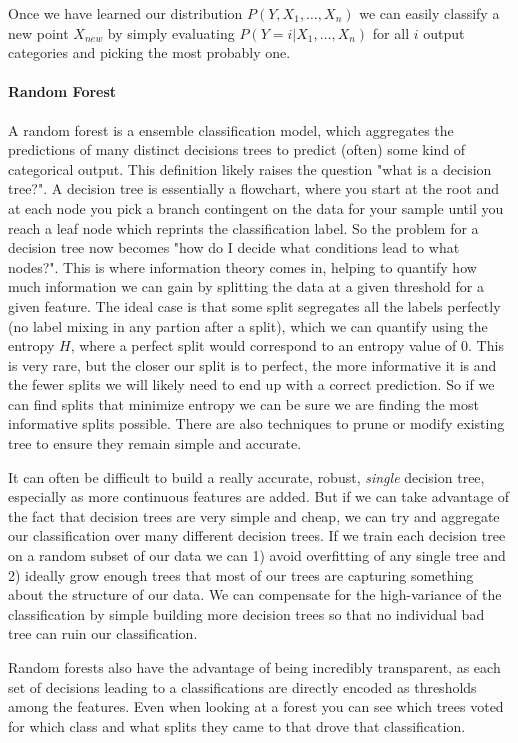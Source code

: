 Once we have learned our distribution $P(Y,X_1,\dots,X_n)$ we can easily classify a new point $X_{new}$ by simply evaluating $P(Y=i|X_1,\dots,X_n)$ for all $i$ output categories and picking the most probably one.

\paragraph{Random Forest}
A random forest is a ensemble classification model, which aggregates the predictions of many distinct decisions trees to predict (often) some kind of categorical output.
This definition likely raises the question "what is a decision tree?".
A decision tree is essentially a flowchart, where you start at the root and at each node you pick a branch contingent on the data for your sample until you reach a leaf node which reprints the classification label.
So the problem for a decision tree now becomes "how do I decide what conditions lead to what nodes?".
This is where information theory comes in, helping to quantify how much information we can gain by splitting the data at a given threshold for a given feature.
The ideal case is that some split segregates all the labels perfectly (no label mixing in any partion after a split), which we can quantify using the entropy $H$, where a perfect split would correspond to an entropy value of 0.
This is very rare, but the closer our split is to perfect, the more informative it is and the fewer splits we will likely need to end up with a correct prediction.
So if we can find splits that minimize entropy we can be sure we are finding the most informative splits possible.
There are also techniques to prune or modify existing tree to ensure they remain simple and accurate.

It can often be difficult to build a really accurate, robust, \emph{single} decision tree, especially as more continuous features are added.
But if we can take advantage of the fact that decision trees are very simple and cheap, we can try and aggregate our classification over many different decision trees.
If we train each decision tree on a random subset of our data we can 1) avoid overfitting of any single tree and 2) ideally grow enough trees that most of our trees are capturing something about the structure of our data.
We can compensate for the high-variance of the classification by simple building more decision trees so that no individual bad tree can ruin our classification.

Random forests also have the advantage of being incredibly transparent, as each set of decisions leading to a classifications are directly encoded as thresholds among the features.
Even when looking at a forest you can see which trees voted for which class and what splits they came to that drove that classification.


